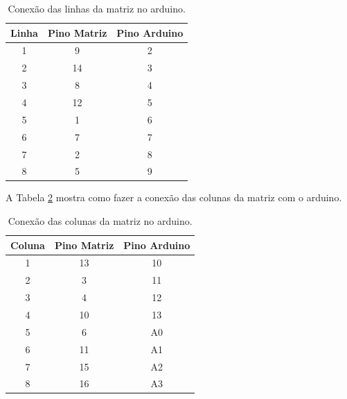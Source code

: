 \documentclass[12pt]{article}
\begin{document}
\begin{table}[H]
	\centering
	\begin{tabular}{|c|c|c|}
	\hline
	\textbf{Linha} & \textbf{Pino Matriz} & \textbf{Pino Arduino} \\ \hline
	1              & 9                    & 2                     \\ \hline
	2              & 14                   & 3                     \\ \hline
	3              & 8                    & 4                     \\ \hline
	4              & 12                   & 5                     \\ \hline
	5              & 1                    & 6                     \\ \hline
	6              & 7                    & 7                     \\ \hline
	7              & 2                    & 8                     \\ \hline
	8              & 5                    & 9                     \\ \hline
	\end{tabular}
	\caption{Conexão das linhas da matriz no arduino.}
	\label{tabMatrizLinhas}
\end{table}

A Tabela \ref{tabMatrizColunas} mostra como fazer a conexão das colunas da matriz com o arduino.

\begin{table}[H]
	\centering
	\begin{tabular}{|c|c|c|}
	\hline
	\textbf{Coluna} & \textbf{Pino Matriz} & \textbf{Pino Arduino} \\ \hline
	1               & 13                   & 10                    \\ \hline
	2               & 3                    & 11                    \\ \hline
	3               & 4                    & 12                    \\ \hline
	4               & 10                   & 13                    \\ \hline
	5               & 6                    & A0                    \\ \hline
	6               & 11                   & A1                    \\ \hline
	7               & 15                   & A2                    \\ \hline
	8               & 16                   & A3                    \\ \hline
	\end{tabular}
	\caption{Conexão das colunas da matriz no arduino.}
	\label{tabMatrizColunas}
\end{table}
\end{document}
